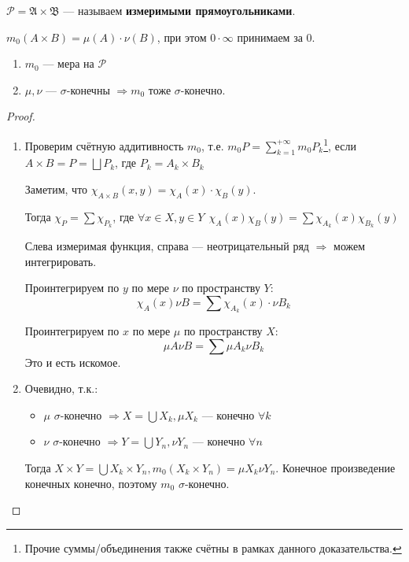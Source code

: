 \begin{obozn}
    \(\mathcal{P} = \mathfrak{A} \times \mathfrak{B}\) --- называем \textbf{измеримыми прямоугольниками}.

    \(m_0(A \times B) = \mu(A) \cdot \nu(B)\), при этом \(0 \cdot \infty\) принимаем за \(0\).
\end{obozn}
\begin{theorem}\itemfix
    \begin{enumerate}
        \item \(m_0\) --- мера на \(\mathcal{P}\)
        \item \(\mu, \nu\) --- \(\sigma\)-конечны \( \Rightarrow m_0\) тоже \(\sigma\)-конечно.
    \end{enumerate}
\end{theorem}
\begin{proof}\itemfix
    \begin{enumerate}
        \item Проверим счётную аддитивность \(m_0\), т.е. \(m_0 P = \sum_{k = 1}^{+\infty} m_0 P_k\)\footnote{Прочие суммы/объединения также счётны в рамках данного доказательства.}, если \(A \times B = P = \bigsqcup P_k\), где \(P_k = A_k \times B_k\)

              Заметим, что \(\chi_{A \times B}(x, y) = \chi_A(x) \cdot \chi_B(y)\).

              Тогда \(\chi_P = \sum \chi_{P_k}\), где \(\forall x\in X, y\in Y \ \ \chi_A(x) \chi_B(y) = \sum \chi_{A_k}(x) \chi_{B_k}(y)\)

              Слева измеримая функция, справа --- неотрицательный ряд \(\Rightarrow\) можем интегрировать.

              Проинтегрируем по \(y\) по мере \(\nu\) по пространству \(Y\):
              \[\chi_A(x) \nu B = \sum \chi_{A_k}(x) \cdot \nu B_k\]

              Проинтегрируем по \(x\) по мере \(\mu\) по пространству \(X\):
              \[\mu A \nu B = \sum \mu A_k \nu B_k\]
              Это и есть искомое.

        \item Очевидно, т.к.:
              \begin{itemize}
                  \item \(\mu\) \(\sigma\)-конечно \( \Rightarrow X = \bigcup X_k, \mu X_k\) --- конечно \(\forall k\)
                  \item \(\nu\) \(\sigma\)-конечно \( \Rightarrow Y = \bigcup Y_n, \nu Y_n\) --- конечно \(\forall n\)
              \end{itemize}

              Тогда \(X \times Y = \bigcup X_k \times Y_n, m_0(X_k \times Y_n) = \mu X_k \nu Y_n\). Конечное произведение конечных конечно, поэтому \(m_0\) \(\sigma\)-конечно.
    \end{enumerate}
\end{proof}


